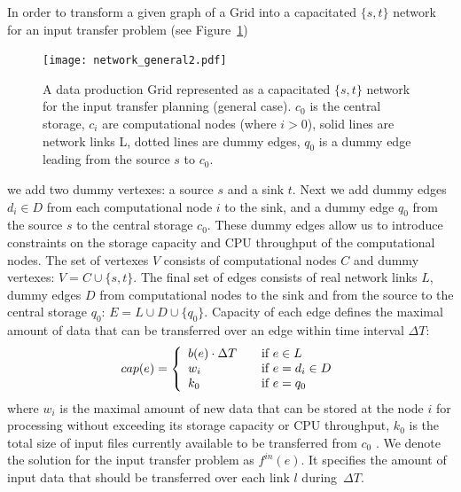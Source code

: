 \documentclass{svjour3}                     %
\begin{document}
In order to transform a given graph of a Grid into a capacitated $\{s,t\}$
network for an input transfer problem (see Figure~\ref{network_general})
%
\begin{figure}[b]
	\begin{center}
		\texttt{[image: network\_general2.pdf]}
	\end{center}
	\caption{A data production Grid represented as a capacitated $\{s,t\}$ network for the input transfer planning (general case). $c_{0}$ is the central storage, $c_{i}$ are computational nodes (where $i>0$), solid lines are network links L, dotted lines are dummy edges, $q_{0}$ is a dummy edge leading from the source $s$ to $c_{0}$. }
	\label{network_general}
\end{figure}  
%
 we add two dummy vertexes: a source $s$
and a sink $t$. Next we add  dummy edges $d_{i} \in D$ from each computational
node $i$ to the sink, and a dummy edge $q_{0}$ from the source $s$ to the
central storage $c_{0}$. These dummy edges allow us to introduce constraints
on the storage capacity and CPU throughput of the computational nodes. The set of vertexes $V$ consists of
computational nodes $C$ and dummy vertexes: $V= C \cup \{s,t\}$. The final set
of edges consists of real network links $L$, dummy edges $D$ from
computational nodes to the sink and from the source to the central storage
$q_{0}$: $E= L \cup D \cup \{q_{0}\}$. Capacity of each edge defines the
maximal amount of data that can be transferred over an edge within time
interval $\Delta T$: 
%
\begin{equation} 
\label{edge_cap} 
cap(e) = \left\{
\begin{array}{l l} 
b(e) \cdot \Delta T & \quad \text{if }e \in L \\
 w_{i} & \quad \text{if } e = d_{i} \in D \\
  k_{0} & \quad \text{if } e = q_{0} 
\end{array} \right.
\end{equation} 
%
where $w_{i}$ is the maximal amount of new data that can be
stored at the node $i$ for processing without exceeding its storage capacity or CPU throughput, $k_{0}$ is the total size of input files currently available to be transferred from $c_{0}$ . We denote the solution for the input transfer problem as $f^{in}(e)$. It specifies the amount of input data that should be transferred over each link $l$ during~$\Delta T$.
\end{document}
